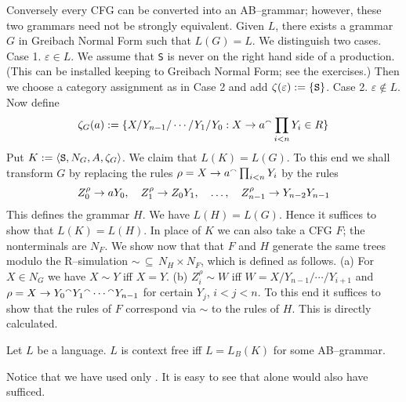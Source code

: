Conversely every CFG can be converted into an AB--grammar; 
however, these two grammars need not be strongly equivalent.
Given $L$, there exists a grammar $G$ in Greibach Normal Form such that 
$L(G) = L$. We distinguish two cases. Case 1. $\varepsilon \in L$.  
We assume that {\tt S} is never on the right hand side of a 
production. (This can be installed keeping to Greibach Normal Form; 
see the exercises.) Then we choose a category assignment as in 
Case 2 and add $\zeta(\varepsilon) := \{\mbox{\tt S}\}$. Case 2.
$\varepsilon \not\in L$. Now define
\begin{equation}
\zeta_G(a) := \{X/Y_{n-1}/\dotsb/Y_1/Y_0
: X \rightarrow a {^{\smallfrown}} \prod_{i < n} Y_i \in R\}
\end{equation}
Put $K := \langle \mbox{\tt S}, N_G, A, \zeta_G\rangle$. We claim that
$L(K) = L(G)$. To this end we shall transform $G$
by replacing the rules $\rho = X \rightarrow a {^{\smallfrown}} \prod_{i < n} Y_i$
by the rules
\begin{equation}
Z^{\rho}_0 \rightarrow a Y_0, \quad Z^{\rho}_1 \rightarrow Z_0 Y_1,
    \quad \dotsc,
        \quad Z^{\rho}_{n-1} \rightarrow Y_{n-2} Y_{n-1}
\end{equation}
This defines the grammar $H$. We have $L(H) = L(G)$. Hence
it suffices to show that $L(K) = L(H)$. In place of $K$
we can also take a CFG $F$; the nonterminals
are $N_F$. We show now that that $F$ and $H$ generate the same
trees modulo the R--simulation $\sim\, \subseteq\, N_H \times N_F$,
which is defined as follows. (a) For $X \in N_G$ we have
$X \sim Y$ iff $X = Y$. (b) $Z^{\rho}_i \sim W$
iff $W = X/Y_{n-1}/\dotsb/Y_{i+1}$ and
$\rho = X \rightarrow Y_0 {^{\smallfrown}} Y_1 {^{\smallfrown}} \dotsm {^{\smallfrown}} Y_{n-1}$
for certain $Y_j$, $i < j < n$. To this end it suffices
to show that the rules of $F$ correspond via $\sim$ to the
rules of $H$. This is directly calculated.
\begin{thm}
Let $L$ be a language. $L$ is context free iff $L = L_B(K)$ for 
some AB--grammar.
\proofend
\end{thm}
Notice that we have used only {\mtt\tf}. It is easy to see that 
{\mtt\tb} alone would also have sufficed.

